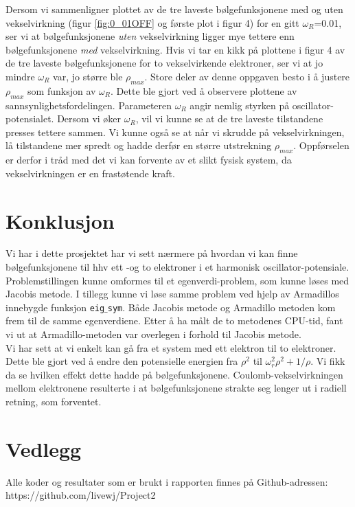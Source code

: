 \documentclass{article}
\begin{document}
Dersom vi sammenligner plottet av de tre laveste bølgefunksjonene med og uten vekselvirkning (figur \ref{fig:0_01OFF} og første plot i figur 4) for en gitt $\omega_R$=0.01, ser vi at bølgefunksjonene \textit{uten} vekselvirkning ligger mye tettere enn bølgefunksjonene \textit{med} vekselvirkning. Hvis vi tar en kikk på plottene i figur 4 av de tre laveste bølgefunksjonene for to vekselvirkende elektroner, ser vi at jo mindre $\omega_R$ var, jo større ble $\rho_{max}$. Store deler av denne oppgaven besto i å justere $\rho_{max}$ som funksjon av $\omega_R$. Dette ble gjort ved å observere plottene av sannsynlighetsfordelingen. Parameteren $\omega_R$ angir nemlig styrken på oscillator-potensialet. Dersom vi øker $\omega_R$, vil vi kunne se at de tre laveste tilstandene presses tettere sammen. Vi kunne også se at når vi skrudde på vekselvirkningen, lå tilstandene mer spredt og hadde derfør en større utstrekning $\rho_{max}$. Oppførselen er derfor i tråd med det vi kan forvente av et slikt fysisk system, da vekselvirkningen er en frastøtende kraft.


\section{Konklusjon}
Vi har i dette prosjektet har vi sett nærmere på hvordan vi kan finne bølgefunksjonene til hhv ett -og to elektroner i et harmonisk oscillator-potensiale. Problemstillingen kunne omformes til et egenverdi-problem, som kunne løses med Jacobis metode. I tillegg kunne vi løse samme problem ved hjelp av Armadillos innebygde funksjon \texttt{eig$\_$sym}. Både Jacobis metode og Armadillo metoden kom frem til de samme egenverdiene. Etter å ha målt de to metodenes CPU-tid, fant vi ut at Armadillo-metoden var overlegen i forhold til Jacobis metode. \\

Vi har sett at vi enkelt kan gå fra et system med ett elektron til to elektroner. Dette ble gjort ved å endre den potensielle energien fra $\rho^2$ til $\omega_r^2\rho^2 + 1/\rho $. Vi fikk da se hvilken effekt dette hadde på bølgefunksjonene. Coulomb-vekselvirkningen mellom elektronene resulterte i at bølgefunksjonene strakte seg lenger ut i radiell retning, som forventet. 

\section{Vedlegg}
Alle koder og resultater som er brukt i rapporten finnes på Github-adressen: https://github.com/livewj/Project2
\end{document}
